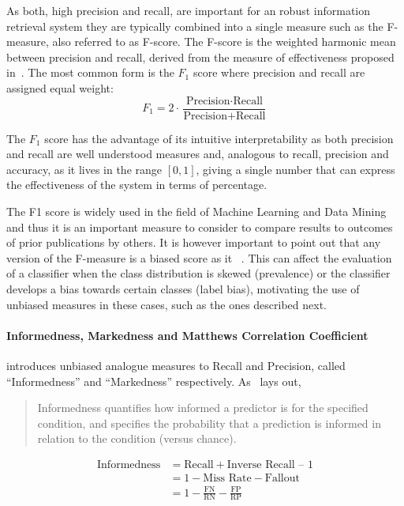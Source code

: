 As both, high precision and recall, are important for an robust information retrieval system they are typically combined into a single measure such as the F-measure, also referred to as F-score. The F-score is the weighted harmonic mean between precision and recall, derived from the measure of effectiveness proposed in~\cite{Rijsbergen:1979aa}. The most common form is the $F_1$ score  where precision and recall are assigned equal weight:
\begin{equation}
  \label{f1measure}
  F_1 = 2 \cdot \frac{\text{Precision} \cdot \text{Recall}}{\text{Precision} + \text{Recall}}
\end{equation}

The $F_1$ score has the advantage of its intuitive interpretability as both precision and recall are well understood measures and, analogous to recall, precision and accuracy, as it lives in the range $[0,1]$, giving a single number that can express the effectiveness of the system in terms of percentage.

The F1 score is widely used in the field of Machine Learning and Data Mining and thus it is an important measure to consider to compare results to outcomes of prior publications by others.
It is however important to point out that any version of the F-measure is a biased score as it ~\cite{Powers:2011aa}. This can affect the evaluation of a classifier when the class distribution is skewed (prevalence) or the classifier develops a bias towards certain classes (label bias), motivating the use of unbiased measures in these cases, such as the ones described next.

\paragraph{Informedness, Markedness and Matthews Correlation Coefficient}
\label{par:Informedness, Markedness and Matthews Correlation Coefficient}

\cite{Powers:2011aa} introduces unbiased analogue measures to Recall and Precision, called ``Informedness'' and ``Markedness'' respectively. As~\cite{Powers:2011aa} lays out, \blockquote{Informedness quantifies how informed a predictor is for the specified condition, and specifies the probability that a prediction is informed in relation to the condition (versus chance).}:

\begin{equation}
  \begin{split}
  \text{Informedness} &= \text{Recall} + \text{Inverse Recall} \text{ – } 1 \\
  &= 1 - \text{Miss Rate} - \text{Fallout} \\
  &= 1 - \frac{\text{FN}}{ \text{RN}} - \frac{\text{FP}}{\text{RP}}
  \end{split}
\end{equation}

